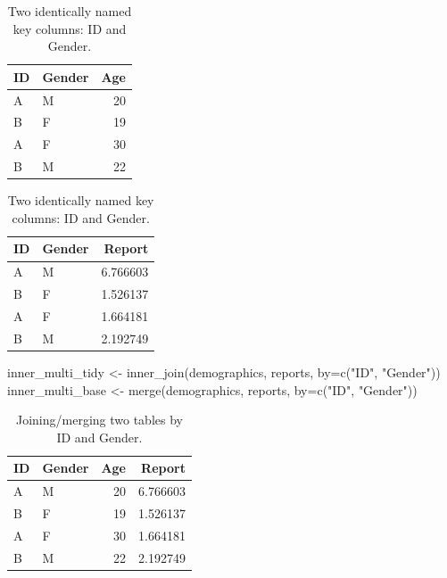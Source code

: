 \documentclass[
]{book}
\newenvironment{Shaded}{\begin{snugshade}}{\end{snugshade}}
\newcommand{\AttributeTok}[1]{\textcolor[rgb]{0.77,0.63,0.00}{#1}}
\newcommand{\FunctionTok}[1]{\textcolor[rgb]{0.00,0.00,0.00}{#1}}
\newcommand{\NormalTok}[1]{#1}
\newcommand{\OtherTok}[1]{\textcolor[rgb]{0.56,0.35,0.01}{#1}}
\newcommand{\StringTok}[1]{\textcolor[rgb]{0.31,0.60,0.02}{#1}}
\begin{document}
\begin{table}
\caption{\label{tab:unnamed-chunk-190}Two identically named key columns: ID and Gender.}

\centering
\begin{tabular}[t]{l|l|r}
\hline
ID & Gender & Age\\
\hline
A & M & 20\\
\hline
B & F & 19\\
\hline
A & F & 30\\
\hline
B & M & 22\\
\hline
\end{tabular}
\centering
\begin{tabular}[t]{l|l|r}
\hline
ID & Gender & Report\\
\hline
A & M & 6.766603\\
\hline
B & F & 1.526137\\
\hline
A & F & 1.664181\\
\hline
B & M & 2.192749\\
\hline
\end{tabular}
\end{table}

\begin{Shaded}
\begin{Highlighting}[]
\NormalTok{inner\_multi\_tidy }\OtherTok{\textless{}{-}} \FunctionTok{inner\_join}\NormalTok{(demographics, reports, }\AttributeTok{by=}\FunctionTok{c}\NormalTok{(}\StringTok{"ID"}\NormalTok{, }\StringTok{"Gender"}\NormalTok{))}
\NormalTok{inner\_multi\_base }\OtherTok{\textless{}{-}} \FunctionTok{merge}\NormalTok{(demographics, reports, }\AttributeTok{by=}\FunctionTok{c}\NormalTok{(}\StringTok{"ID"}\NormalTok{, }\StringTok{"Gender"}\NormalTok{))}
\end{Highlighting}
\end{Shaded}

\begin{table}

\caption{\label{tab:unnamed-chunk-192}Joining/merging two tables by ID and Gender.}
\centering
\begin{tabular}[t]{l|l|r|r}
\hline
ID & Gender & Age & Report\\
\hline
A & M & 20 & 6.766603\\
\hline
B & F & 19 & 1.526137\\
\hline
A & F & 30 & 1.664181\\
\hline
B & M & 22 & 2.192749\\
\hline
\end{tabular}
\end{table}
\end{document}
